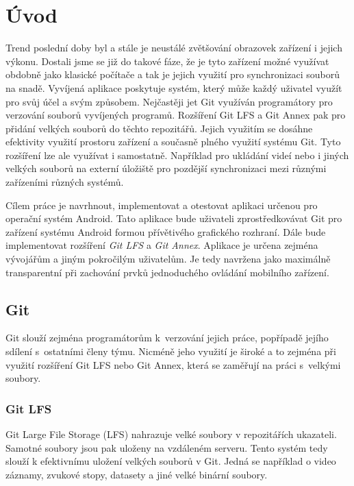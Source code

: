 \chapter{Úvod}
Trend poslední doby byl a stále je neustálé zvětšování obrazovek zařízení i jejich výkonu. Dostali jsme se již do takové fáze, že je tyto zařízení možné využívat obdobně jako klasické počítače a tak je jejich využití pro synchronizaci souborů na snadě.
Vyvíjená aplikace poskytuje systém, který může každý uživatel využít pro svůj účel a svým způsobem. Nejčastěji jet Git využíván programátory pro verzování souborů vyvíjených programů. Rozšíření Git LFS a Git Annex pak pro přidání velkých souborů do těchto repozitářů. Jejich využitím se dosáhne efektivity využití prostoru zařízení a současně plného využití systému Git. Tyto rozšíření lze ale využívat i samostatně. Například pro ukládání videí nebo i jiných velkých souborů na externí úložiště pro pozdější synchronizaci mezi různými zařízeními různých systémů.

Cílem práce je navrhnout, implementovat a otestovat aplikaci určenou pro operační systém Android. Tato aplikace bude uživateli zprostředkovávat Git pro zařízení systému Android formou přívětivého grafického rozhraní. Dále bude implementovat rozšíření \emph{Git LFS} a \emph{Git Annex}. Aplikace je určena zejména vývojářům a jiným pokročilým uživatelům. Je tedy navržena jako maximálně transparentní při zachování prvků jednoduchého ovládání mobilního zařízení.

\newpage
\section {Git}
Git slouží zejména programátorům k verzování jejich práce, popřípadě jejího sdílení s ostatními členy týmu. Nicméně jeho využití je široké a to zejména při využití rozšíření Git LFS nebo Git Annex, která se zaměřují na práci s velkými soubory.

\subsection{Git LFS}
Git Large File Storage (LFS) nahrazuje velké soubory v repozitářích ukazateli. Samotné soubory jsou pak uloženy na vzdáleném serveru. Tento systém tedy slouží k efektivnímu uložení velkých souborů v Git. Jedná se například o video záznamy, zvukové stopy, datasety a jiné velké binární soubory.

